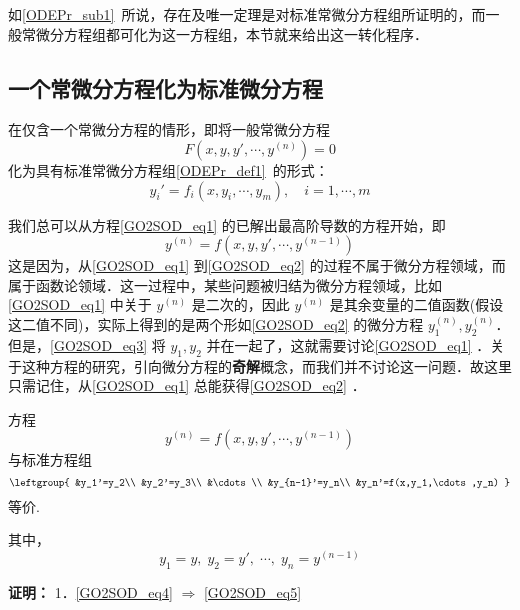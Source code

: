 
如\autoref{ODEPr_sub1}~所说，存在及唯一定理是对标准常微分方程组所证明的，而一般常微分方程组都可化为这一方程组，本节就来给出这一转化程序．

\subsection{一个常微分方程化为标准微分方程}
在仅含一个常微分方程的情形，即将一般常微分方程
\begin{equation}\label{GO2SOD_eq1}
F(x,y,y',\cdots,y^{(n)})=0
\end{equation}
化为具有标准常微分方程组\autoref{ODEPr_def1}~的形式：
\begin{equation}\label{GO2SOD_eq3}
y_i'=f_i(x,y_i,\cdots,y_m),\quad i=1,\cdots,m
\end{equation}

我们总可以从方程\autoref{GO2SOD_eq1} 的已解出最高阶导数的方程开始，即
\begin{equation}\label{GO2SOD_eq2}
y^{(n)}=f(x,y,y',\cdots,y^{(n-1)})
\end{equation}
这是因为，从\autoref{GO2SOD_eq1} 到\autoref{GO2SOD_eq2} 的过程不属于微分方程领域，而属于函数论领域．这一过程中，某些问题被归结为微分方程领域，比如\autoref{GO2SOD_eq1} 中关于 $y^{(n)}$ 是二次的，因此 $y^{(n)}$ 是其余变量的二值函数(假设这二值不同)，实际上得到的是两个形如\autoref{GO2SOD_eq2} 的微分方程 $y_1^{(n)},y_2^{(n)}$．但是，\autoref{GO2SOD_eq3} 将 $y_1,y_2$ 并在一起了，这就需要讨论\autoref{GO2SOD_eq1} ．关于这种方程的研究，引向微分方程的\textbf{奇解}概念，而我们并不讨论这一问题．故这里只需记住，从\autoref{GO2SOD_eq1} 总能获得\autoref{GO2SOD_eq2} ．
\begin{theorem}{}
方程
\begin{equation}\label{GO2SOD_eq4}
y^{(n)}=f(x,y,y',\cdots,y^{(n-1)})
\end{equation}
与标准方程组
\begin{equation}\label{GO2SOD_eq5}
\leftgroup{
&y_1'=y_2\\
&y_2'=y_3\\
&\cdots\\
&y_{n-1}'=y_n\\
&y_n'=f(x,y_1,\cdots,y_n)
}
\end{equation}
等价.

其中，
\begin{equation}\label{GO2SOD_eq6}
y_1=y,\;y_2=y',\;\cdots,\;y_n=y^{(n-1)}
\end{equation}
\end{theorem}
\textbf{证明：}
1．\autoref{GO2SOD_eq4} $\Rightarrow$ \autoref{GO2SOD_eq5} 

